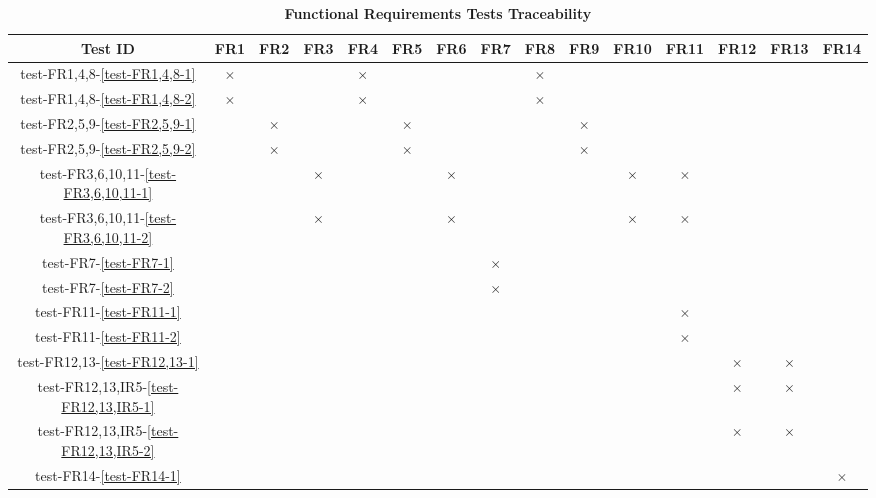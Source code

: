 \documentclass[12pt, titlepage]{article}
\begin{document}
\begin{table}[H]
  \centering
  \begin{tabular}{|c|c|c|c|c|c|c|c|c|c|c|c|c|c|c|}
  \hline
   Test ID & FR1 & FR2 & FR3 & FR4 & FR5 & FR6 & FR7 & FR8 & FR9 & FR10 & FR11 & FR12 & FR13 & FR14\\
  \hline
  test-FR1,4,8-\ref{test-FR1,4,8-1} & $\times$ & & & $\times$ & & & & $\times$ & & & & & & \\
  \hline
  test-FR1,4,8-\ref{test-FR1,4,8-2} & $\times$ & & & $\times$ & & & & $\times$ & & & & & & \\
  \hline
  test-FR2,5,9-\ref{test-FR2,5,9-1} & & $\times$ & & & $\times$ & & & & $\times$ & & & & & \\
  \hline
  test-FR2,5,9-\ref{test-FR2,5,9-2} & & $\times$ & & & $\times$ & & & & $\times$ & & & & & \\
  \hline
  test-FR3,6,10,11-\ref{test-FR3,6,10,11-1} & & & $\times$ & & & $\times$ & & & & $\times$ & $\times$ & & & \\
  \hline
  test-FR3,6,10,11-\ref{test-FR3,6,10,11-2} & & & $\times$ & & & $\times$ & & & & $\times$ & $\times$ & & & \\
  \hline
  test-FR7-\ref{test-FR7-1} & & & & & & & $\times$ & & & & & & & \\
  \hline
  test-FR7-\ref{test-FR7-2} & & & & & & & $\times$ & & & & & & & \\
  \hline
  test-FR11-\ref{test-FR11-1} & & & & & & & & & & & $\times$ & & & \\
  \hline
  test-FR11-\ref{test-FR11-2} & & & & & & & & & & & $\times$ & & & \\
  \hline
  test-FR12,13-\ref{test-FR12,13-1} & & & & & & & & & & & & $\times$ & $\times$ & \\
  \hline
  test-FR12,13,IR5-\ref{test-FR12,13,IR5-1} & & & & & & & & & & & & $\times$ & $\times$ & \\
  \hline
  test-FR12,13,IR5-\ref{test-FR12,13,IR5-2} & & & & & & & & & & & & $\times$ & $\times$ & \\
  \hline
  test-FR14-\ref{test-FR14-1} & & & & & & & & & & & & & & $\times$ \\
  \hline
\end{tabular}
\caption{\bf Functional Requirements Tests Traceability} \label{tab:fr-test-traceability}
\end{table}
\end{document}

